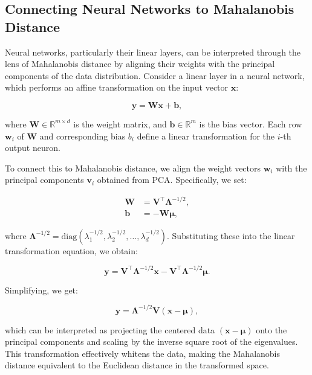 \subsection{Connecting Neural Networks to Mahalanobis Distance}

Neural networks, particularly their linear layers, can be interpreted through the lens of Mahalanobis distance by aligning their weights with the principal components of the data distribution. Consider a linear layer in a neural network, which performs an affine transformation on the input vector $\mathbf{x}$:

\begin{equation}
\mathbf{y} = \mathbf{W} \mathbf{x} + \mathbf{b},
\end{equation}

where $\mathbf{W} \in \mathbb{R}^{m \times d}$ is the weight matrix, and $\mathbf{b} \in \mathbb{R}^m$ is the bias vector. Each row $\mathbf{w}_i$ of $\mathbf{W}$ and corresponding bias $b_i$ define a linear transformation for the $i$-th output neuron.

To connect this to Mahalanobis distance, we align the weight vectors $\mathbf{w}_i$ with the principal components $\mathbf{v}_i$ obtained from PCA. Specifically, we set:

\begin{align}
\label{eq:w_and_b_definitions}
\mathbf{W} &= \mathbf{V}^\top \boldsymbol{\Lambda}^{-1/2}, \\
\mathbf{b} &= -\mathbf{W} \boldsymbol{\mu},
\end{align}

where $\boldsymbol{\Lambda}^{-1/2} = \text{diag}(\lambda_1^{-1/2}, \lambda_2^{-1/2}, \dots, \lambda_d^{-1/2})$. Substituting these into the linear transformation equation, we obtain:

\begin{equation}
\mathbf{y} = \mathbf{V}^\top \boldsymbol{\Lambda}^{-1/2} \mathbf{x} - \mathbf{V}^\top \boldsymbol{\Lambda}^{-1/2} \boldsymbol{\mu}.
\end{equation}

Simplifying, we get:

\begin{equation}
\mathbf{y} = \boldsymbol{\Lambda}^{-1/2} \mathbf{V} (\mathbf{x} - \boldsymbol{\mu}),
\end{equation}

which can be interpreted as projecting the centered data $(\mathbf{x} - \boldsymbol{\mu})$ onto the principal components and scaling by the inverse square root of the eigenvalues. This transformation effectively whitens the data, making the Mahalanobis distance equivalent to the Euclidean distance in the transformed space.

